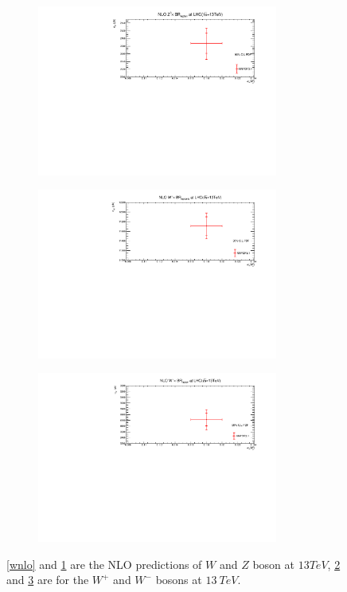 \begin{figure}[H]
\begin{subfigure}{0.49\textwidth}
\end{subfigure}
\begin{subfigure}{0.49\textwidth}
\includegraphics[height=5.6cm, width=\textwidth]{chapter4/Znlo13.pdf}
\vspace*{-6mm}
\caption{}
\label{znlo}
\end{subfigure}
\begin{subfigure}{0.49\textwidth}
\includegraphics[height=5.6cm, width=\textwidth]{chapter4/Wpnlo13.pdf}
\vspace*{-6mm}
\caption{}
\label{wpnlo}
\end{subfigure}
\begin{subfigure}{0.49\textwidth}
\includegraphics[height=5.6cm, width=\textwidth]{chapter4/Wmnlo13.pdf}
\vspace*{-6mm}
\caption{}
\label{wmnlo}
\end{subfigure}
\caption{\ref{wnlo} and \ref{znlo} are the NLO predictions of $W$ and $Z$ boson at $13TeV$, \ref{wpnlo} and \ref{wmnlo} are for the $W^{+}$ and $W^{-}$ bosons at $13~TeV$.}
\label{NLO_WZ}
\end{figure}



